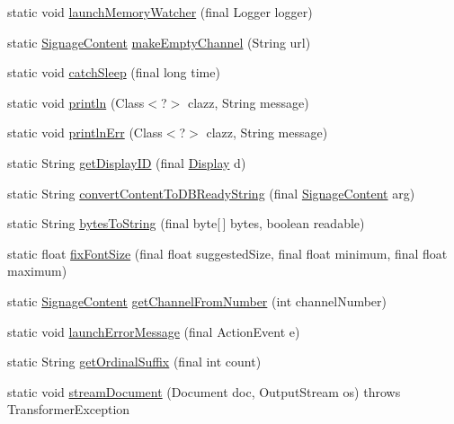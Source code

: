 \begin{DoxyCompactItemize}
\item 
static void \hyperlink{classgov_1_1fnal_1_1ppd_1_1dd_1_1util_1_1Util_a14a313b4148f9d231f1f5c6c7385cfc1}{launch\-Memory\-Watcher} (final Logger logger)
\item 
static \hyperlink{interfacegov_1_1fnal_1_1ppd_1_1dd_1_1signage_1_1SignageContent}{Signage\-Content} \hyperlink{classgov_1_1fnal_1_1ppd_1_1dd_1_1util_1_1Util_aac24d11cbe3cf38954965cd285954857}{make\-Empty\-Channel} (String url)
\item 
static void \hyperlink{classgov_1_1fnal_1_1ppd_1_1dd_1_1util_1_1Util_ab7b5b1e401eb2fcf485e0f75aced8a24}{catch\-Sleep} (final long time)
\item 
static void \hyperlink{classgov_1_1fnal_1_1ppd_1_1dd_1_1util_1_1Util_a79b524ff854cd49170ad6d03dc12d66c}{println} (Class$<$?$>$ clazz, String message)
\item 
static void \hyperlink{classgov_1_1fnal_1_1ppd_1_1dd_1_1util_1_1Util_a3152af255123f8d4b4663563834f1cf2}{println\-Err} (Class$<$?$>$ clazz, String message)
\item 
static String \hyperlink{classgov_1_1fnal_1_1ppd_1_1dd_1_1util_1_1Util_ac4da7b50fd640752e2790ee3808aa151}{get\-Display\-I\-D} (final \hyperlink{interfacegov_1_1fnal_1_1ppd_1_1dd_1_1signage_1_1Display}{Display} d)
\item 
static String \hyperlink{classgov_1_1fnal_1_1ppd_1_1dd_1_1util_1_1Util_ac304b57158b9b48661e84fb1695f40bf}{convert\-Content\-To\-D\-B\-Ready\-String} (final \hyperlink{interfacegov_1_1fnal_1_1ppd_1_1dd_1_1signage_1_1SignageContent}{Signage\-Content} arg)
\item 
static String \hyperlink{classgov_1_1fnal_1_1ppd_1_1dd_1_1util_1_1Util_aadd84363c5d4610ec407b4c084350539}{bytes\-To\-String} (final byte\mbox{[}$\,$\mbox{]} bytes, boolean readable)
\item 
static float \hyperlink{classgov_1_1fnal_1_1ppd_1_1dd_1_1util_1_1Util_aba2bdd36102f83592f055146a6e83325}{fix\-Font\-Size} (final float suggested\-Size, final float minimum, final float maximum)
\item 
static \hyperlink{interfacegov_1_1fnal_1_1ppd_1_1dd_1_1signage_1_1SignageContent}{Signage\-Content} \hyperlink{classgov_1_1fnal_1_1ppd_1_1dd_1_1util_1_1Util_abe73b82f4fc3a56a1960af054402ff14}{get\-Channel\-From\-Number} (int channel\-Number)
\item 
static void \hyperlink{classgov_1_1fnal_1_1ppd_1_1dd_1_1util_1_1Util_afbfd1f27a99c8c0dc14eaf0d0c77fa4d}{launch\-Error\-Message} (final Action\-Event e)
\item 
static String \hyperlink{classgov_1_1fnal_1_1ppd_1_1dd_1_1util_1_1Util_a8a317852e12eca5eb1f1bc03752ac463}{get\-Ordinal\-Suffix} (final int count)
\item 
static void \hyperlink{classgov_1_1fnal_1_1ppd_1_1dd_1_1util_1_1Util_a1345265879de0123b77b95fe392eb2f3}{stream\-Document} (Document doc, Output\-Stream os)  throws Transformer\-Exception 
\end{DoxyCompactItemize}
